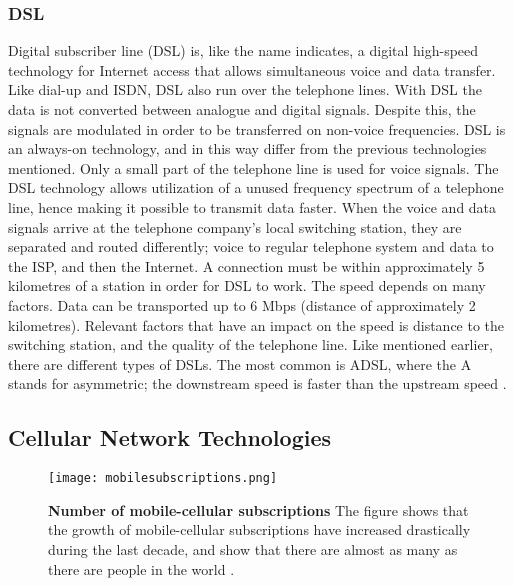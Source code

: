 \subsubsection{DSL}
Digital subscriber line (DSL) is, like the name indicates, a digital high-speed technology for Internet access that allows simultaneous voice and data transfer. Like dial-up and ISDN, DSL also run over the telephone lines. With DSL the data is not converted between analogue and digital signals. Despite this, the signals are modulated in order to be transferred on non-voice frequencies. DSL is an always-on technology, and in this way differ from the previous technologies mentioned. Only a small part of the telephone line is used for voice signals. The DSL technology allows utilization of a unused frequency spectrum of a telephone line, hence making it possible to transmit data faster. When the voice and data signals arrive at the telephone company's local switching station, they are separated and routed differently; voice to regular telephone system and data to the ISP, and then the Internet. A connection must be within approximately 5 kilometres of a station in order for DSL to work. The speed depends on many factors. Data can be transported up to 6 Mbps (distance of approximately 2 kilometres). Relevant factors that have an impact on the speed is distance to the switching station, and the quality of the telephone line. Like mentioned earlier, there are different types of DSLs. The most common is ADSL, where the A stands for asymmetric; the downstream speed is faster than the upstream speed \cite{differentuplinks}.



\subsection{Cellular Network Technologies}

\begin{figure}[b]
  \centering
      \texttt{[image: mobilesubscriptions.png]}
  \caption [Number of mobile-cellular subscriptions]{\textbf{Number of mobile-cellular subscriptions} The figure shows that the growth of mobile-cellular subscriptions have increased drastically during the last decade, and show that there are almost as many as there are people in the world \cite{itu2013}.}
  \label{fig:subscribers}
\end{figure}

